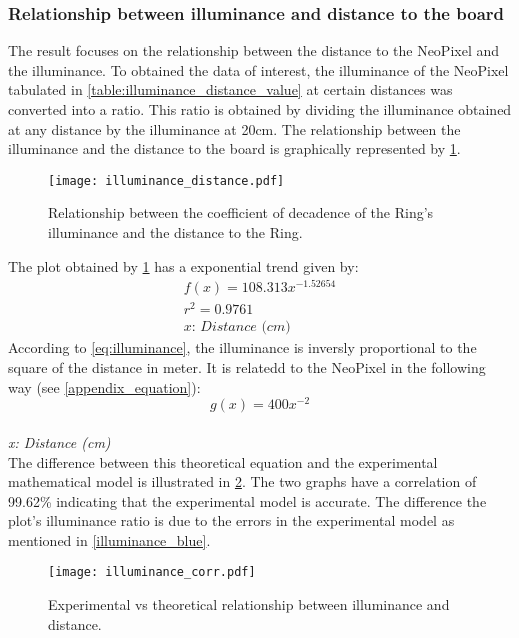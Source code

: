 \subsubsection{Relationship between illuminance and distance to the board}
The result focuses on the relationship between the distance to the NeoPixel and the illuminance. To obtained the data of interest, the illuminance of the NeoPixel tabulated in \cref{table:illuminance_distance_value} at certain distances was converted into a ratio. This ratio is obtained by dividing the illuminance obtained at any distance by the illuminance at 20cm. The relationship between the illuminance and the distance to the board is graphically represented by \cref{fig:illuminance_distance}.
\begin{figure}[ht]
	\centering
	\texttt{[image: illuminance\_distance.pdf]}
	\caption{Relationship between the coefficient of decadence of the Ring's illuminance and the distance to the Ring.}
	\label{fig:illuminance_distance}
\end{figure}
The plot obtained by \cref{fig:illuminance_distance} has a exponential trend given by:
\begin{equation}
\label{eq:f_distance}
\begin{multlined}
f(x) = 108.313x^{-1.52654} \\
r^2 = 0.9761\\
\textit{$x$: Distance (cm)}
\end{multlined}
\end{equation} 
According to \cref{eq:illuminance}, the illuminance is inversly proportional to the square of the distance in meter. It is relatedd to the NeoPixel in the following way (see \cref{appendix_equation}):\\
{
	\centering    
	\[g(x) = 400x^{-2}\]\\
	\textit{x: Distance (cm)}\\
}
The difference between this theoretical equation and the experimental mathematical model is illustrated in \cref{fig:illuminance_corr}. The two graphs have a correlation of 99.62\% indicating that the experimental model is accurate. The difference the plot's illuminance ratio is due to the errors in the experimental model as mentioned in \cref{illuminance_blue}. 
\begin{figure}[ht]
	\centering
	\texttt{[image: illuminance\_corr.pdf]}
	\caption{Experimental vs theoretical relationship between illuminance and distance.}
	\label{fig:illuminance_corr}
\end{figure}

